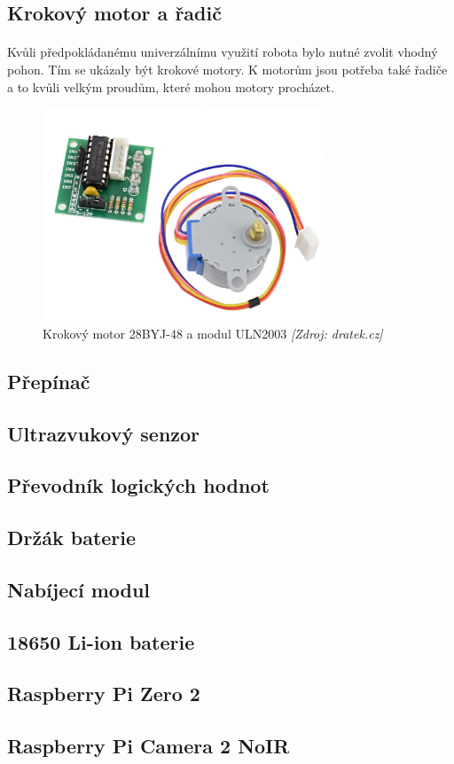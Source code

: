 \documentclass[12pt]{article}
\begin{document}
\begin{spacing}{1.5}
	\subsection{Krokový motor a řadič}
	\paragraph{} Kvůli předpokládanému univerzálnímu využití robota bylo nutné zvolit vhodný pohon. Tím se ukázaly být krokové motory. K motorům jsou potřeba také řadiče a to kvůli velkým proudům, které mohou motory procházet.
	\begin{figure}[H]
		\centering
		\includegraphics[width=240pt]{stepper_modul}
		\caption{Krokový motor 28BYJ-48 a modul ULN2003 \textit{[Zdroj: dratek.cz]}}
		\label{fig:stepper_modul}
	\end{figure}
	\subsection{Přepínač}
	\paragraph{} 
	\subsection{Ultrazvukový senzor}
	\subsection{Převodník logických hodnot}
	\subsection{Držák baterie}
	\subsection{Nabíjecí modul}
	\subsection{18650 Li-ion baterie}
	\subsection{Raspberry Pi Zero 2}
	\subsection{Raspberry Pi Camera 2 NoIR}
	
\end{spacing}
\end{document}
